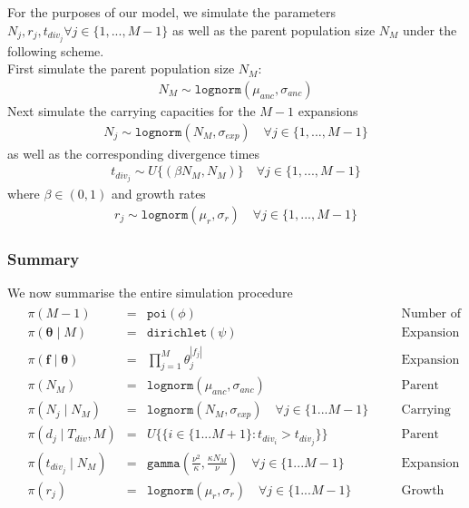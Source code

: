 \documentclass{report}
\theoremstyle{definition}
\begin{document}
For the purposes of our model, we simulate the parameters $N_j, r_j, t_{div_j} \forall j \in \{1,...,M-1\}$ as well as the parent population size $N_{M}$ under the following scheme.\\
First simulate the parent population size $N_{M}$:
\begin{gather}
N_{M} \sim \texttt{lognorm}(\mu_{anc}, \sigma_{anc})
\end{gather}
Next simulate the carrying capacities for the $M-1$ expansions
\begin{gather}
N_{j} \sim \texttt{lognorm}(N_{M}, \sigma_{exp}) \quad\forall j \in \{1,...,M-1\}
\end{gather}
as well as the corresponding divergence times
\begin{gather}
t_{div_j} \sim U\{(\beta N_{M}, N_{M})\} \quad\forall j \in \{1,...,M-1\}
\end{gather}
where $\beta \in (0,1)$
and growth rates
\begin{gather}
r_{j} \sim \texttt{lognorm}(\mu_r, \sigma_r) \quad\forall j \in \{1,...,M-1\}
\end{gather} 
\subsubsection{Summary}
We now summarise the entire simulation procedure
\begin{gather}
\begin{aligned}
&\pi(M-1) &=& \texttt{poi}(\phi) &\quad&\text{Number of expansions} \\
&\pi(\pmb\theta\mid M) &=& \texttt{dirichlet}(\psi) &\quad&\text{Expansion Membership Probabilities} \\
&\pi(\mathbf{f\mid\pmb\theta}) &=& \prod\limits_{j=1}^M\theta_j^{|f_j|}&\quad&\text{Expansion Membership Assignment} \\
&\pi(N_M) &=& \texttt{lognorm}(\mu_{anc},\sigma_{anc}) &\quad&\text{Parent Population Size}\\
&\pi(N_j\mid N_{M}) &=& \texttt{lognorm}(N_{M},\sigma_{exp})\quad\forall j \in \{1...M-1\} &\quad&\text{Carrying Capacities}\\
&\pi(d_j\mid T_{div}, M) &=& U\{\{i\in \{1 ... M+1\} : t_{div_i} > t_{div_j}\}\} &\quad&\text{Parent Populations}\\
&\pi(t_{div_j}\mid N_{M}) &=& \texttt{gamma}\left(\frac{\nu^2}{\kappa}, \frac{\kappa N_M}{\nu}\right) \quad\forall j \in \{1...M-1\} &\quad&\text{Expansion Times}\\
&\pi(r_j) &=& \texttt{lognorm}(\mu_{r},\sigma_{r})\quad\forall j \in \{1...M-1\} &\quad&\text{Growth Rates}
\end{aligned}
\end{gather}
\end{document}
